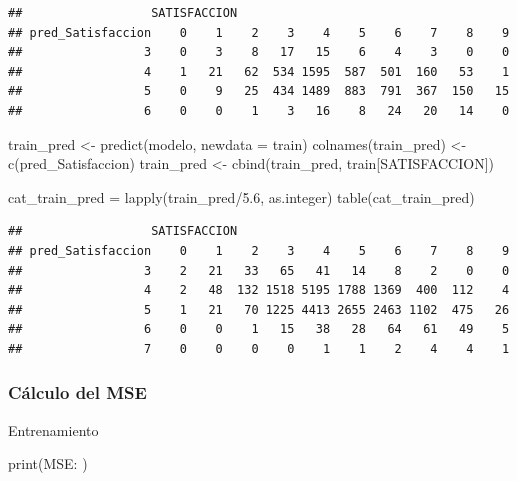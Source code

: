 \documentclass[
]{article}
\newenvironment{Shaded}{\begin{snugshade}}{\end{snugshade}}
\newcommand{\AttributeTok}[1]{\textcolor[rgb]{0.77,0.63,0.00}{#1}}
\newcommand{\FloatTok}[1]{\textcolor[rgb]{0.00,0.00,0.81}{#1}}
\newcommand{\FunctionTok}[1]{\textcolor[rgb]{0.00,0.00,0.00}{#1}}
\newcommand{\NormalTok}[1]{#1}
\newcommand{\OtherTok}[1]{\textcolor[rgb]{0.56,0.35,0.01}{#1}}
\newcommand{\SpecialCharTok}[1]{\textcolor[rgb]{0.00,0.00,0.00}{#1}}
\newcommand{\StringTok}[1]{\textcolor[rgb]{0.31,0.60,0.02}{#1}}
\begin{document}
\begin{verbatim}
##                  SATISFACCION
## pred_Satisfaccion    0    1    2    3    4    5    6    7    8    9
##                 3    0    3    8   17   15    6    4    3    0    0
##                 4    1   21   62  534 1595  587  501  160   53    1
##                 5    0    9   25  434 1489  883  791  367  150   15
##                 6    0    0    1    3   16    8   24   20   14    0
\end{verbatim}

\begin{Shaded}
\begin{Highlighting}[]
\NormalTok{train\_pred }\OtherTok{\textless{}{-}} \FunctionTok{predict}\NormalTok{(modelo, }\AttributeTok{newdata =}\NormalTok{ train)}
\FunctionTok{colnames}\NormalTok{(train\_pred) }\OtherTok{\textless{}{-}} \FunctionTok{c}\NormalTok{(}\StringTok{\textquotesingle{}pred\_Satisfaccion\textquotesingle{}}\NormalTok{)}
\NormalTok{train\_pred }\OtherTok{\textless{}{-}} \FunctionTok{cbind}\NormalTok{(train\_pred, train[}\StringTok{\textquotesingle{}SATISFACCION\textquotesingle{}}\NormalTok{])}

\NormalTok{cat\_train\_pred }\OtherTok{=} \FunctionTok{lapply}\NormalTok{(train\_pred}\SpecialCharTok{/}\FloatTok{5.6}\NormalTok{, as.integer)}
\FunctionTok{table}\NormalTok{(cat\_train\_pred)}
\end{Highlighting}
\end{Shaded}

\begin{verbatim}
##                  SATISFACCION
## pred_Satisfaccion    0    1    2    3    4    5    6    7    8    9
##                 3    2   21   33   65   41   14    8    2    0    0
##                 4    2   48  132 1518 5195 1788 1369  400  112    4
##                 5    1   21   70 1225 4413 2655 2463 1102  475   26
##                 6    0    0    1   15   38   28   64   61   49    5
##                 7    0    0    0    0    1    1    2    4    4    1
\end{verbatim}

\hypertarget{cuxe1lculo-del-mse}{%
\subsubsection{Cálculo del MSE}\label{cuxe1lculo-del-mse}}

Entrenamiento

\begin{Shaded}
\begin{Highlighting}[]
\FunctionTok{print}\NormalTok{(}\StringTok{\textquotesingle{}MSE:\textquotesingle{}}\NormalTok{ )}
\end{Highlighting}
\end{Shaded}
\end{document}
